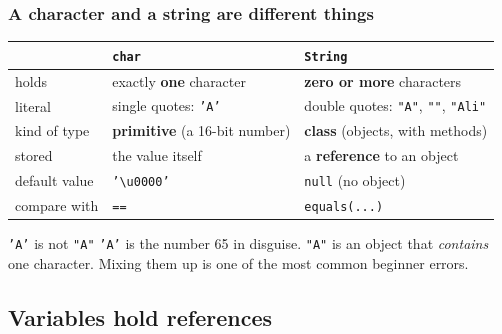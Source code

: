 \documentclass[aspectratio=169,10pt,compress]{beamer}
\begin{document}
\begin{frame}[t,fragile] \frametitle{A character and a string are different things}
  \small
  \begin{tabular}{@{}L{0.22\textwidth}L{0.33\textwidth}L{0.36\textwidth}@{}}
    \toprule
                       & \textbf{\texttt{char}}                  & \textbf{\texttt{String}} \\
    \midrule
    holds              & exactly \textbf{one} character           & \textbf{zero or more} characters \\
    literal            & single quotes: \texttt{'A'}              & double quotes: \texttt{"A"}, \texttt{""}, \texttt{"Ali"} \\
    kind of type       & \textbf{primitive} (a 16-bit number)     & \textbf{class} (objects, with methods) \\
    stored             & the value itself                          & a \textbf{reference} to an object \\
    default value      & \texttt{'\textbackslash u0000'}          & \texttt{null} (no object) \\
    compare with       & \texttt{==}                               & \texttt{equals(...)} \\
    \bottomrule
  \end{tabular}

  \vspace{0.8em}
  \begin{alertblock}{\texttt{'A'} is not \texttt{"A"}}
    \texttt{'A'} is the number 65 in disguise. \texttt{"A"} is an object that \emph{contains} one character.
    Mixing them up is one of the most common beginner errors.
  \end{alertblock}
\end{frame}


\subsection[Reference]{Variables hold references}
\end{document}
